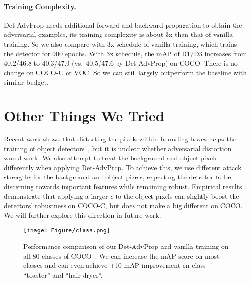\documentclass[final]{cvpr}
\begin{document}
\paragraph{Training Complexity.}
Det-AdvProp needs additional forward and backward propagation to obtain the adversarial examples, its training complexity is about 3x than that of vanilla training. So we also compare with 3x schedule of vanilla training, which trains the detector for 900 epochs. 
With 3x schedule, the mAP of D1/D3 increases from 40.2/46.8 to 40.3/47.0 (vs.\ 40.5/47.6 by Det-AdvProp) on COCO. 
There is no change on COCO-C or VOC.
So we can still largely outperform the baseline with similar budget.

\section{Other Things We Tried}
Recent work shows that distorting the pixels within bounding boxes helps the training of object detectors~\cite{zoph2019learning}, but it is unclear whether adversarial distortion would work.
We also attempt to treat the background and object pixels differently when applying Det-AdvProp.
To achieve this, we use different attack strengths for the background and object pixels, expecting the detector to be discerning towards important features while remaining robust.
Empirical results demonstrate that applying a larger $\epsilon$ to the object pixels can slightly boost the detectors' robustness on COCO-C, but does not make a big different on COCO.
We will further explore this direction in future work.


\begin{figure*}[!htb]
\centering
\texttt{[image: Figure/class.png]}
\caption{Performance comparison of our Det-AdvProp and vanilla training on all 80 classes of COCO~\cite{lin2015coco}.
We can increase the mAP score on most classes and can even achieve +10 mAP improvement on class ``toaster'' and ``hair dryer''.}
\label{fig:class}
\end{figure*}
\end{document}

